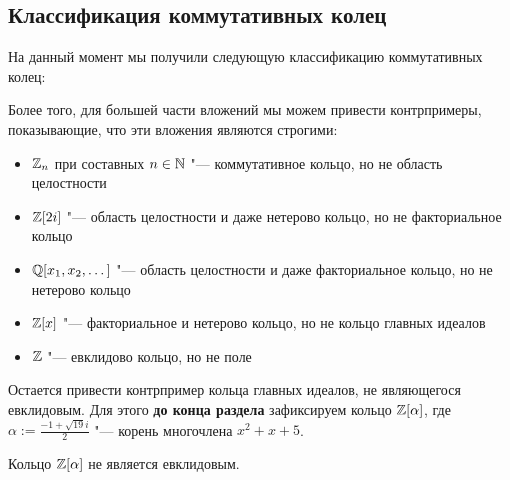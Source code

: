 \subsection{Классификация коммутативных колец}

На данный момент мы получили следующую классификацию коммутативных колец:
\begin{center}\end{center}

Более того, для большей части вложений мы можем привести контрпримеры, показывающие, что эти вложения являются строгими:
\begin{itemize}
	\item $\mathbb{Z}_n$ при составных $n \in \mathbb{N}$ "--- коммутативное кольцо, но не область целостности
	\item $\mathbb{Z}[2i]$ "--- область целостности и даже нетерово кольцо, но не факториальное кольцо
	\item $\mathbb{Q}[x_1, x_2, \dotsc]$ "--- область целостности и даже факториальное кольцо, но не нетерово кольцо
	\item $\mathbb{Z}[x]$ "--- факториальное и нетерово кольцо, но не кольцо главных идеалов
	\item $\mathbb{Z}$ "--- евклидово кольцо, но не поле
\end{itemize}

Остается привести контрпример кольца главных идеалов, не являющегося евклидовым. Для этого \textbf{до конца раздела} зафиксируем кольцо $\mathbb{Z}[\alpha]$, где $\alpha := \frac{-1 + \sqrt{19}i}2$ "--- корень многочлена $x^2 + x + 5$.

\begin{theorem}
	Кольцо $\mathbb{Z}[\alpha]$ не является евклидовым.
\end{theorem}

